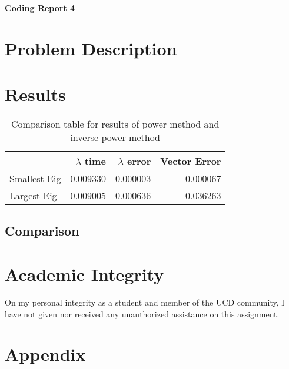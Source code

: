 \documentclass[a4paper,12pt]{article}
\begin{document}
\begin{center} %
	{\Large \bf Coding Report 4} %
	\vspace{2mm}
\end{center}  


\section{Problem Description}



\section{Results}

\begin{table}[h]
\begin{center}

	\begin{tabular}{lrrr}
		\toprule
		{} &  $\lambda$ time &  $\lambda$ error &  Vector Error \\
		\midrule
		Smallest Eig &     0.009330 &      0.000003 &      0.000067 \\
		Largest Eig  &     0.009005 &      0.000636 &      0.036263 \\
		\bottomrule
		\end{tabular}
	\caption{Comparison table for results of power method and inverse power method}
\end{center}
\end{table}

\subsection{Comparison}


\section{Academic Integrity}
On my personal integrity as a student and member of the UCD community, I have not given nor received any unauthorized assistance on this assignment.


\section{Appendix}



\end{document}
